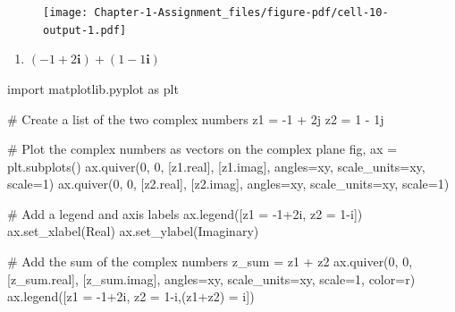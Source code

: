 \documentclass[
  letterpaper,
  DIV=11,
  numbers=noendperiod]{scrartcl}
\newenvironment{Shaded}{\begin{snugshade}}{\end{snugshade}}
\newcommand{\CommentTok}[1]{\textcolor[rgb]{0.37,0.37,0.37}{#1}}
\newcommand{\DecValTok}[1]{\textcolor[rgb]{0.68,0.00,0.00}{#1}}
\newcommand{\ImportTok}[1]{\textcolor[rgb]{0.00,0.46,0.62}{#1}}
\newcommand{\NormalTok}[1]{\textcolor[rgb]{0.00,0.23,0.31}{#1}}
\newcommand{\OperatorTok}[1]{\textcolor[rgb]{0.37,0.37,0.37}{#1}}
\newcommand{\OtherTok}[1]{\textcolor[rgb]{0.00,0.23,0.31}{#1}}
\newcommand{\StringTok}[1]{\textcolor[rgb]{0.13,0.47,0.30}{#1}}
\providecommand{\tightlist}{%
  \setlength{\itemsep}{0pt}\setlength{\parskip}{0pt}}\usepackage{longtable,booktabs,array}
\begin{document}
\begin{figure}[H]

{\centering \texttt{[image: Chapter-1-Assignment\_files/figure-pdf/cell-10-output-1.pdf]}

}

\end{figure}

\begin{enumerate}
\def\labelenumi{\alph{enumi}.}
\setcounter{enumi}{1}
\tightlist
\item
  \((-1 + 2\mathbf i) + (1 - 1\mathbf i)\)\\
\end{enumerate}

\begin{Shaded}
\begin{Highlighting}[numbers=left,,]
\ImportTok{import}\NormalTok{ matplotlib.pyplot }\ImportTok{as}\NormalTok{ plt}

\CommentTok{\# Create a list of the two complex numbers}
\NormalTok{z1 }\OperatorTok{=} \OperatorTok{{-}}\DecValTok{1} \OperatorTok{+} \OtherTok{2j}
\NormalTok{z2 }\OperatorTok{=} \DecValTok{1} \OperatorTok{{-}} \OtherTok{1j}

\CommentTok{\# Plot the complex numbers as vectors on the complex plane}
\NormalTok{fig, ax }\OperatorTok{=}\NormalTok{ plt.subplots()}
\NormalTok{ax.quiver(}\DecValTok{0}\NormalTok{, }\DecValTok{0}\NormalTok{, [z1.real], [z1.imag], angles}\OperatorTok{=}\StringTok{\textquotesingle{}xy\textquotesingle{}}\NormalTok{, scale\_units}\OperatorTok{=}\StringTok{\textquotesingle{}xy\textquotesingle{}}\NormalTok{, scale}\OperatorTok{=}\DecValTok{1}\NormalTok{)}
\NormalTok{ax.quiver(}\DecValTok{0}\NormalTok{, }\DecValTok{0}\NormalTok{, [z2.real], [z2.imag], angles}\OperatorTok{=}\StringTok{\textquotesingle{}xy\textquotesingle{}}\NormalTok{, scale\_units}\OperatorTok{=}\StringTok{\textquotesingle{}xy\textquotesingle{}}\NormalTok{, scale}\OperatorTok{=}\DecValTok{1}\NormalTok{)}

\CommentTok{\# Add a legend and axis labels}
\NormalTok{ax.legend([}\StringTok{\textquotesingle{}z1 = {-}1+2i\textquotesingle{}}\NormalTok{, }\StringTok{\textquotesingle{}z2 = 1{-}i\textquotesingle{}}\NormalTok{])}
\NormalTok{ax.set\_xlabel(}\StringTok{\textquotesingle{}Real\textquotesingle{}}\NormalTok{)}
\NormalTok{ax.set\_ylabel(}\StringTok{\textquotesingle{}Imaginary\textquotesingle{}}\NormalTok{)}

\CommentTok{\# Add the sum of the complex numbers}
\NormalTok{z\_sum }\OperatorTok{=}\NormalTok{ z1 }\OperatorTok{+}\NormalTok{ z2}
\NormalTok{ax.quiver(}\DecValTok{0}\NormalTok{, }\DecValTok{0}\NormalTok{, [z\_sum.real], [z\_sum.imag], angles}\OperatorTok{=}\StringTok{\textquotesingle{}xy\textquotesingle{}}\NormalTok{, scale\_units}\OperatorTok{=}\StringTok{\textquotesingle{}xy\textquotesingle{}}\NormalTok{, scale}\OperatorTok{=}\DecValTok{1}\NormalTok{, color}\OperatorTok{=}\StringTok{\textquotesingle{}r\textquotesingle{}}\NormalTok{)}
\NormalTok{ax.legend([}\StringTok{\textquotesingle{}z1 = {-}1+2i\textquotesingle{}}\NormalTok{, }\StringTok{\textquotesingle{}z2 = 1{-}i\textquotesingle{}}\NormalTok{,}\StringTok{\textquotesingle{}(z1+z2) = i\textquotesingle{}}\NormalTok{])}


\end{Highlighting}
\end{Shaded}
\end{document}
